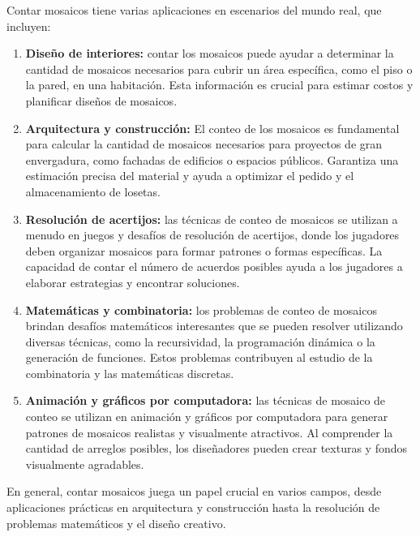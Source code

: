 Contar mosaicos tiene varias aplicaciones en escenarios del mundo real, que incluyen:

\begin{enumerate}
\item \textbf{Diseño de interiores:} contar los mosaicos puede ayudar a determinar la cantidad de mosaicos necesarios para cubrir un área específica, como el piso o la pared, en una habitación. Esta información es crucial para estimar costos y planificar diseños de mosaicos.

\item \textbf{Arquitectura y construcción:} El conteo de los mosaicos es fundamental para calcular la cantidad de mosaicos necesarios para proyectos de gran envergadura, como fachadas de edificios o espacios públicos. Garantiza una estimación precisa del material y ayuda a optimizar el pedido y el almacenamiento de losetas.

\item \textbf{Resolución de acertijos:} las técnicas de conteo de mosaicos se utilizan a menudo en juegos y desafíos de resolución de acertijos, donde los jugadores deben organizar mosaicos para formar patrones o formas específicas. La capacidad de contar el número de acuerdos posibles ayuda a los jugadores a elaborar estrategias y encontrar soluciones.

\item \textbf{Matemáticas y combinatoria:} los problemas de conteo de mosaicos brindan desafíos matemáticos interesantes que se pueden resolver utilizando diversas técnicas, como la recursividad, la programación dinámica o la generación de funciones. Estos problemas contribuyen al estudio de la combinatoria y las matemáticas discretas.

\item \textbf{Animación y gráficos por computadora:} las técnicas de mosaico de conteo se utilizan en animación y gráficos por computadora para generar patrones de mosaicos realistas y visualmente atractivos. Al comprender la cantidad de arreglos posibles, los diseñadores pueden crear texturas y fondos visualmente agradables.
\end{enumerate}

En general, contar mosaicos juega un papel crucial en varios campos, desde aplicaciones prácticas en arquitectura y construcción hasta la resolución de problemas matemáticos y el diseño creativo.